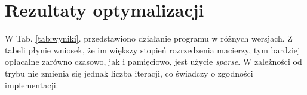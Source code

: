 \documentclass[a4paper,margin=1.54cm]{article}
\begin{document}
\section{Rezultaty optymalizacji}
W Tab. \ref{tab:wyniki}. przedstawiono działanie programu w różnych wersjach. Z tabeli płynie wniosek, że im większy stopień rozrzedzenia macierzy, tym bardziej opłacalne zarówno czasowo, jak i pamięciowo, jest użycie \textit{sparse}. W zależności od trybu nie zmienia się jednak liczba iteracji, co świadczy o zgodności implementacji. 
\begin{table}[!ht]
\caption{Optymalizacja programu}
\label{tab:wyniki}
\end{table}
\end{document}
